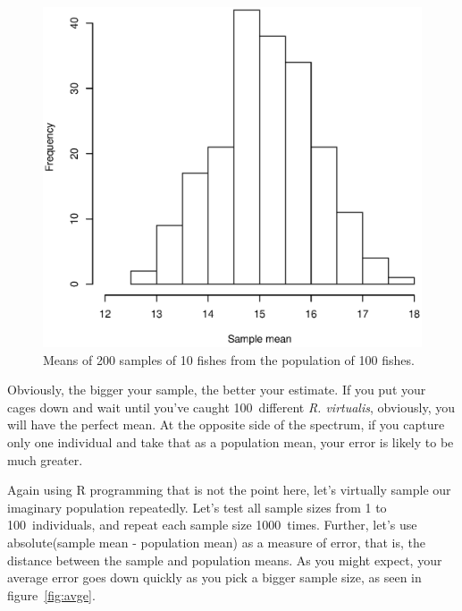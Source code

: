 \documentclass{report}
\newcommand{\code}[1]{\textsf{\ttfamily #1}}
\newcommand{\species}[1]{\textit{#1}}
\begin{document}
			\begin{figure}[h]
				\centering
				\includegraphics[width=1.0\textwidth]{mean_distribution.eps}
				\caption{Means of 200 samples of 10 fishes from the population of 100 fishes.}
				\label{fig:md}
			\end{figure}
			
			Obviously, the bigger your sample, the better your estimate. If you put your cages down and wait until you've caught 100~different \species{R. virtualis}, obviously, you will have the perfect mean. At the opposite side of the spectrum, if you capture only one individual and take that as a population mean, your error is likely to be much greater.
			
			Again using R programming that is not the point here, let's virtually sample our imaginary population repeatedly. Let's test all sample sizes from 1 to 100~individuals, and repeat each sample size 1000~times. Further, let's use \code{absolute(sample mean - population mean)} as a measure of error, that is, the distance between the sample and population means. As you might expect, your average error goes down quickly as you pick a bigger sample size, as seen in figure~\ref{fig:avge}.
			
\end{document}
